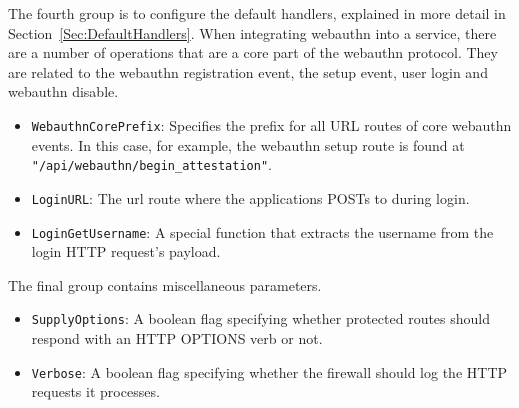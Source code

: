 \iffalse

The \lstinline{GetUserID} is a function that, given an HTTP request, extracts the current logged in user's ID. Since this is very application specific, it is up to the engineer to implement this function. The \lstinline{ContextGetters} is a hash map of context tags and context getter functions. When the engineer sets up routes to protect, there is a clean way to invoke these functions by tag to retrieve more context as needed.

\fi

\noindent The fourth group is to configure the default handlers, explained in more detail in Section~\ref{Sec:DefaultHandlers}. When integrating webauthn into a service, there are a number of operations that are a core part of the webauthn protocol. They are related to the webauthn registration event, the setup event, user login and webauthn disable. 

\begin{itemize}[nosep]
\item \lstinline{WebauthnCorePrefix}: Specifies the prefix for all URL routes of core webauthn events. In this case, for example, the webauthn setup route is found at \lstinline{"/api/webauthn/begin_attestation"}.

\item \lstinline{LoginURL}: The url route where the applications POSTs to during login.

\item \lstinline{LoginGetUsername}: A special function that extracts the username from the login HTTP request's payload.

\end{itemize}

\iffalse

The \lstinline{WebauthnCorePrefix} specifies the prefix for all URL routes of core webauthn events. In this case, for example, the webauthn setup route is found at \lstinline{"/api/webauthn/begin_attestation"}. The \lstinline{LoginURL} is the url route where the applications POSTs to during login. The \lstinline{LoginGetUsername} is a special function that extracts the username from the login HTTP request's payload.

\fi

\noindent The final group contains miscellaneous parameters.

\begin{itemize}[nosep]

\item \lstinline{SupplyOptions}: A boolean flag specifying whether protected routes should respond with an HTTP OPTIONS verb or not.

\item \lstinline{Verbose}: A boolean flag specifying whether the firewall should log the HTTP requests it processes.

\end{itemize}

